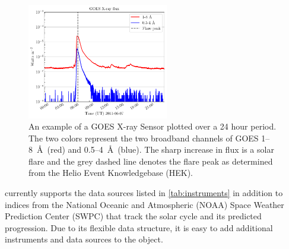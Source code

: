 \begin{figure}
    \centering
    \includegraphics[width=0.55\textwidth]{figures/timeseries_example.pdf}
    \caption{An example of a GOES X-ray Sensor \Timeseries plotted over a 24 hour period. The two colors represent the two broadband channels of GOES 1--8~\AA\ (red) and 0.5--4~\AA\ (blue).  The sharp increase in flux is a solar flare and the grey dashed line denotes the flare peak as determined from the Helio Event Knowledgebase (HEK).}
    \label{fig:timeseries_example}
\end{figure}

\Timeseries currently supports the data sources listed in \autoref{tab:instruments} in addition to indices from the National Oceanic and Atmospheric (NOAA) Space Weather Prediction Center (SWPC) that track the solar cycle and its predicted progression. Due to its flexible data structure, it is easy to add additional instruments and data sources to the \Timeseries object.

